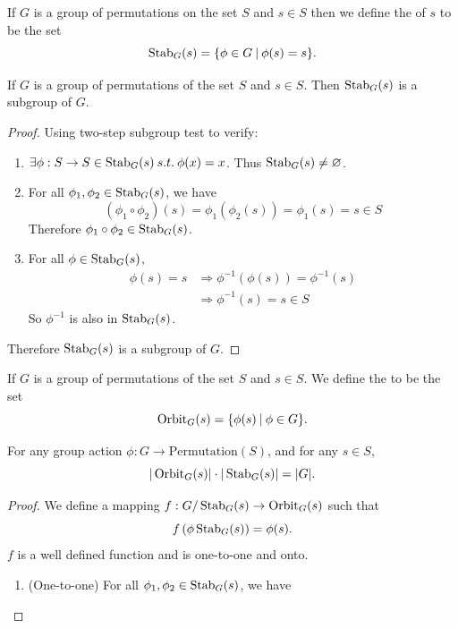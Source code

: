 \begin{definition}
    If $G$ is a group of permutations on the set $S$ and $s \in S$ then we define the  
    of $s$ to be the set 
    \[
    \operatorname{Stab}_G(s) = \{ \phi \in G \> | \> \phi(s) = s \}.
    \]
\end{definition}

\begin{lemma}
    If $G$ is a group of permutations of the set $S$ and $s \in S$. Then $\operatorname{Stab}_G(s)$ is a subgroup of $G$.
\end{lemma}
\begin{proof}
    Using two-step subgroup test to verify:
    \begin{enumerate}
        \item $\exists \phi: S \to S \in \operatorname{Stab}_G(s) \> s.t. \> \phi(x) = x$. Thus $\operatorname{Stab}_G(s) \neq \varnothing$.
        \item For all $\phi_1, \phi_2 \in \operatorname{Stab}_G(s)$, we have 
        \[
            (\phi_1 \circ \phi_2)(s) = \phi_1 \left( \phi_2(s) \right)
            = \phi_1(s) = s \in S
        \]
        Therefore $\phi_1 \circ \phi_2 \in \operatorname{Stab}_G(s)$.

        \item For all $\phi \in \operatorname{Stab}_G(s)$, 
        \begin{align*}
            \phi(s) = s &\Rightarrow \phi^{-1} \left( \phi (s) \right) = \phi^{-1}(s)\\
            &\Rightarrow \phi^{-1}(s) = s \in S
        \end{align*}
        So $\phi^{-1}$ is also in $\operatorname{Stab}_G(s)$.
    \end{enumerate}

    Therefore $\operatorname{Stab}_G(s)$ is a subgroup of $G$.
\end{proof}

\begin{definition}
    If $G$ is a group of permutations of the set $S$ and $s \in S$. We define the  to be the set
    \[
        \operatorname{Orbit}_G(s) = \{ \phi(s) \> | \> \phi \in G \}.
    \]
\end{definition}

\begin{theorem}
    For any group action $\phi : G \to \text{Permutation}(S)$, and for any $s \in S$,
    \begin{equation}
        |\operatorname{Orbit}_G(s)| \cdot |\operatorname{Stab}_G(s)| = |G|.
    \end{equation}
\end{theorem}
\begin{proof}
    We define a mapping $f: G/\operatorname{Stab}_G(s) \to \operatorname{Orbit}_G(s)$ such that 
    \[
        f\left( \phi \operatorname{Stab}_G(s) \right) = \phi(s).
    \]
    $f$ is a well defined function and is one-to-one and onto. 
    \begin{enumerate}
        \item (One-to-one) For all $\phi_1, \phi_2 \in \operatorname{Stab}_G(s)$, we have
    \end{enumerate}
\end{proof}

